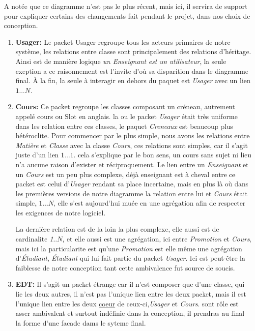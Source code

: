 \documentclass[a4paper,french,final]{memoir}
\begin{document}
A notée que ce diagramme n'est pas le plus récent, mais ici, il servira de support pour
expliquer certains des changements fait pendant le projet, dans nos choix de conception.


 \begin{enumerate}
    \item \textbf{Usager:}
Le packet Usager regroupe tous les acteurs primaires de notre système, les relations entre classe sont principalement des relations d'héritage.
Ainsi est de manière logique \emph{un Enseignant est un utilisateur}, la seule exeption a ce raisonnement est l'invite d'où sa disparition dans le diagramme final.
À la fin, la seule à interagir en dehors du paquet est \emph{Usager} avec un lien $1\dots N$.


\begin{center}
    
\end{center}


    \item \textbf{Cours: }Ce packet regroupe les classes composant un créneau, autrement
    appelé cours ou Slot en anglais. la ou le packet \emph{Usager} était très uniforme dans les
    relation entre ces classes, le paquet \emph{Creneaux} est beaucoup plus hétéroclite. Pour commencer par le plus simple, nous avons les relations entre \emph{Matière} et \emph{Classe} avec
    la classe \emph{Cours}, ces relations sont simples, car il s'agit juste d'un lien $1\dots1$.
    cela s'explique par le bon sens, un cours sans sujet ni lieu n'a aucune raison d'exister et réciproquement. Le lien entre un \emph{Enseignant} et un \emph{Cours} est un peu plus complexe, déjà enseignant est à cheval entre ce packet est celui d'\emph{Usager} rendant sa place incertaine, mais en plus là où
    dans les premières versions de notre diagramme la relation entre lui et \emph{Cours} était simple, $1\dots N$, elle s'est aujourd'hui muée en une agrégation afin de respecter
    les exigences de notre logiciel.
    
    
    La dernière relation est de la loin la plus complexe, elle aussi est de cardinalite
    \emph{1}..$N$, et elle aussi est une agrégation, ici entre \emph{Promotion} et \emph{Cours}, mais ici la particularite est qu'une \emph{Promotion} est elle même une agrégation d'\emph{Étudiant}, \emph{Étudiant} qui lui fait partie du packet \emph{Usager}. Ici est peut-être la faiblesse de notre
    conception tant cette ambivalence fut source de soucis.
    

    \item \textbf{EDT:} Il s'agit un packet étrange car il n'est composer que d'une classe,
    qui lie les deux autres, il n'est pas l'unique lien entre les deux packet, mais il est
    l'unique lien entre les deux \underline{coeur} de ceux-ci,\emph{Usager} et \emph{Cours}. sont rôle est asser
    ambivalent et surtout indéfinie dans la conception, il prendras au final la forme d'une facade
    dams le syteme final.
\end{enumerate}
\end{document}
